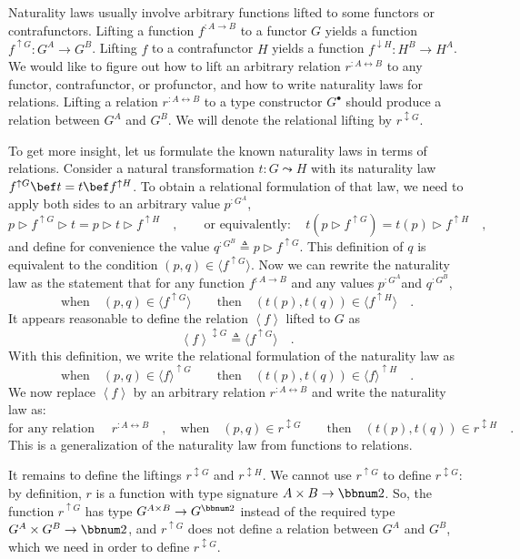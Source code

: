 Naturality laws usually involve arbitrary functions lifted to some
functors or contrafunctors. Lifting a function $f^{:A\rightarrow B}$
to a functor $G$ yields a function $f^{\uparrow G}:G^{A}\rightarrow G^{B}$.
Lifting $f$ to a contrafunctor $H$ yields a function $f^{\downarrow H}:H^{B}\rightarrow H^{A}$.
We would like to figure out how to lift an arbitrary relation $r^{:A\leftrightarrow B}$
to any functor, contrafunctor, or profunctor, and how to write naturality
laws for relations. Lifting a relation $r^{:A\leftrightarrow B}$
to a type constructor $G^{\bullet}$ should produce a relation between
$G^{A}$ and $G^{B}$. We will denote the relational lifting by $r^{\updownarrow G}$.

To get more insight, let us formulate the known naturality laws in
terms of relations. Consider a natural transformation $t:G\leadsto H$
with its naturality law $f^{\uparrow G}\bef t=t\bef f^{\uparrow H}$.
To obtain a relational formulation of that law, we need to apply both
sides to an arbitrary value $p^{:G^{A}}$,
\[
p\triangleright f^{\uparrow G}\triangleright t=p\triangleright t\triangleright f^{\uparrow H}\quad,\quad\quad\text{or equivalently}:\quad t(p\triangleright f^{\uparrow G})=t(p)\triangleright f^{\uparrow H}\quad,
\]
and define for convenience the value $q^{:G^{B}}\triangleq p\triangleright f^{\uparrow G}$.
This definition of $q$ is equivalent to the condition $(p,q)\in\langle f^{\uparrow G}\rangle$.
Now we can rewrite the naturality law as the statement that for any
function $f^{:A\rightarrow B}$ and any values $p^{:G^{A}}$and $q^{:G^{B}}$,
\[
\text{when}\quad(p,q)\in\langle f^{\uparrow G}\rangle\quad\quad\text{then}\quad(t(p),t(q))\in\langle f^{\uparrow H}\rangle\quad.
\]
It appears reasonable to define the relation $\left<f\right>$ lifted
to $G$ as 
\[
\left<f\right>^{\updownarrow G}\triangleq\langle f^{\uparrow G}\rangle\quad.
\]
With this definition, we write the relational formulation of the naturality
law as
\[
\text{when}\quad(p,q)\in\langle f\rangle^{\uparrow G}\quad\quad\text{then}\quad(t(p),t(q))\in\langle f\rangle^{\uparrow H}\quad.
\]
We now replace $\left<f\right>$ by an arbitrary relation $r^{:A\leftrightarrow B}$
and write the naturality law as:
\[
\text{for any relation }\quad r^{:A\leftrightarrow B}\quad,\quad\text{when}\quad(p,q)\in r^{\updownarrow G}\quad\quad\text{then}\quad(t(p),t(q))\in r^{\updownarrow H}\quad.
\]
This is a generalization of the naturality law from functions to relations. 

It remains to define the liftings $r^{\updownarrow G}$ and $r^{\updownarrow H}$.
We cannot use $r^{\uparrow G}$ to define $r^{\updownarrow G}$: by
definition, $r$ is a function with type signature $A\times B\rightarrow\bbnum 2$.
So, the function $r^{\uparrow G}$ has type $G^{A\times B}\rightarrow G^{\bbnum 2}$
instead of the required type $G^{A}\times G^{B}\rightarrow\bbnum 2$,
and $r^{\uparrow G}$ does not define a relation between $G^{A}$
and $G^{B}$, which we need in order to define $r^{\updownarrow G}$. 

